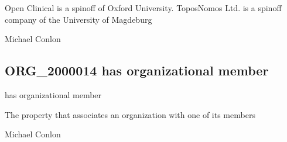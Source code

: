 \documentclass[letterpaper,10pt,english]{sphinxmanual}
\begin{document}
\begin{sphinxShadowBox}

\sphinxAtStartPar
Open Clinical is a spin\sphinxhyphen{}off of Oxford University. ToposNomos Ltd. is a spin\sphinxhyphen{}off company of the University of Magdeburg
\end{sphinxShadowBox}

\begin{sphinxShadowBox}

\sphinxAtStartPar
Michael Conlon 
\end{sphinxShadowBox}
\begin{quote}

\ignorespaces \end{quote}


\subsection{ORG\_2000014 \sphinxhyphen{} has organizational member}
\label{\detokenize{doc-ORG_2000014:org-2000014-has-organizational-member}}\label{\detokenize{doc-ORG_2000014:index-0}}\label{\detokenize{doc-ORG_2000014::doc}}
\begin{sphinxShadowBox}

\sphinxAtStartPar
has organizational member
\end{sphinxShadowBox}

\begin{sphinxShadowBox}

\sphinxAtStartPar
{}
\end{sphinxShadowBox}

\begin{sphinxShadowBox}

\sphinxAtStartPar
The property that associates an organization with one of its members
\end{sphinxShadowBox}

\begin{sphinxShadowBox}

\sphinxAtStartPar
Michael Conlon 
\end{sphinxShadowBox}
\end{document}
